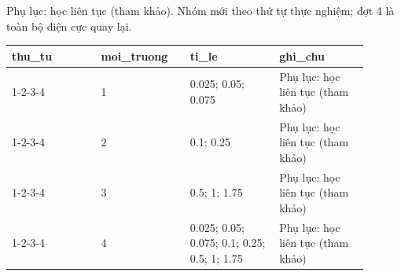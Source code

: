 \par\smallskip\noindent Phụ lục: học liên tục (tham khảo). Nhóm mới theo thứ tự thực nghiệm; đợt 4 là toàn bộ điện cực quay lại.\par
\begin{longtable}{p{0.225\linewidth}p{0.225\linewidth}p{0.225\linewidth}p{0.225\linewidth}}
\toprule
thu\_tu & moi\_truong & ti\_le & ghi\_chu \\ \midrule \endhead
1-2-3-4 & 1 & 0.025; 0.05; 0.075 & Phụ lục: học liên tục (tham khảo) \\
1-2-3-4 & 2 & 0.1; 0.25 & Phụ lục: học liên tục (tham khảo) \\
1-2-3-4 & 3 & 0.5; 1; 1.75 & Phụ lục: học liên tục (tham khảo) \\
1-2-3-4 & 4 & 0.025; 0.05; 0.075; 0.1; 0.25; 0.5; 1; 1.75 & Phụ lục: học liên tục (tham khảo) \\
\bottomrule
\end{longtable}
